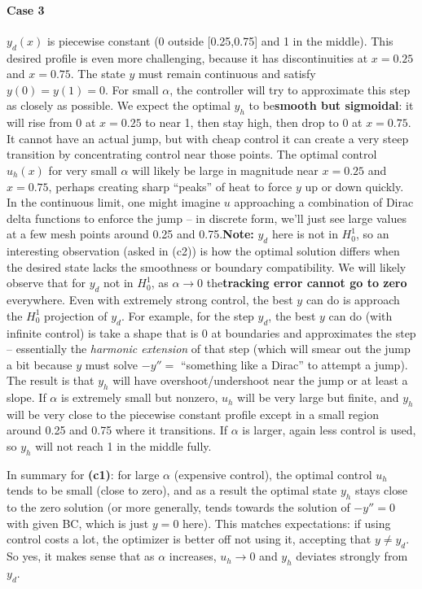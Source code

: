 \documentclass[a4paper,10pt]{report}
\begin{document}
\paragraph{Case 3}
\(y_d(x)\) is piecewise constant (0 outside [0.25,0.75] and 1 in the middle).
This desired profile is even more challenging, because it has discontinuities at \(x=0.25\) and \(x=0.75\). The state \(y\) must remain continuous and satisfy \(y(0)=y(1)=0\). For small \(\alpha\), the controller will try to approximate this step as closely as possible. We expect the optimal \(y_h\) to be\textbf{smooth but sigmoidal}: it will rise from 0 at \(x=0.25\) to near 1, then stay high, then drop to 0 at \(x=0.75\). It cannot have an actual jump, but with cheap control it can create a very steep transition by concentrating control near those points. The optimal control \(u_h(x)\) for very small \(\alpha\) will likely be large in magnitude near \(x=0.25\) and \(x=0.75\), perhaps creating sharp “peaks” of heat to force \(y\) up or down quickly. In the continuous limit, one might imagine \(u\) approaching a combination of Dirac delta functions to enforce the jump – in discrete form, we'll just see large values at a few mesh points around 0.25 and 0.75.\textbf{Note:} \(y_d\) here is not in \(H^1_0\), so an interesting observation (asked in (c2)) is how the optimal solution differs when the desired state lacks the smoothness or boundary compatibility. We will likely observe that for \(y_d\) not in \(H^1_0\), as \(\alpha \to 0\) the\textbf{tracking error cannot go to zero} everywhere. Even with extremely strong control, the best \(y\) can do is approach the \(H^1_0\) projection of \(y_d\). For example, for the step \(y_d\), the best \(y\) can do (with infinite control) is take a shape that is 0 at boundaries and approximates the step – essentially the \emph{harmonic extension} of that step (which will smear out the jump a bit because \(y\) must solve \(-y'' = \) “something like a Dirac” to attempt a jump). The result is that \(y_h\) will have overshoot/undershoot near the jump or at least a slope. If \(\alpha\) is extremely small but nonzero, \(u_h\) will be very large but finite, and \(y_h\) will be very close to the piecewise constant profile except in a small region around 0.25 and 0.75 where it transitions. If \(\alpha\) is larger, again less control is used, so \(y_h\) will not reach 1 in the middle fully.


In summary for \textbf{(c1)}: for large \(\alpha\) (expensive control), the optimal control \(u_h\) tends to be small (close to zero), and as a result the optimal state \(y_h\) stays close to the zero solution (or more generally, tends towards the solution of \(-y''=0\) with given BC, which is just \(y=0\) here). This matches expectations: if using control costs a lot, the optimizer is better off not using it, accepting that \(y \neq y_d\). So yes, it makes sense that as \(\alpha\) increases, \(u_h \to 0\) and \(y_h\) deviates strongly from \(y_d\).
\end{document}
